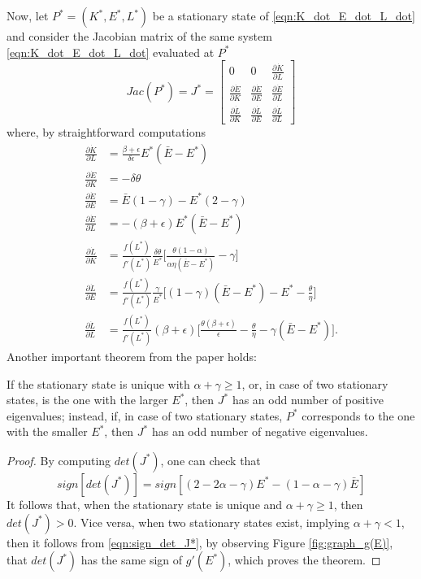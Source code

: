 Now, let $P^*=(K^*,E^*,L^*)$ be a stationary state of \eqref{eqn:K_dot_E_dot_L_dot} and consider the Jacobian matrix of the same system \eqref{eqn:K_dot_E_dot_L_dot} evaluated at $P^*$
$$
Jac(P^*)=J^* =
\begin{bmatrix}
	0 & 
	0 & 
	\frac{\partial\dot{K}}{\partial L} \\[1ex] %
	\frac{\partial\dot{E}}{\partial K} & 
	\frac{\partial\dot{E}}{\partial E} & 
	\frac{\partial\dot{E}}{\partial L} \\[1ex]
	\frac{\partial\dot{L}}{\partial K} & 
	\frac{\partial\dot{L}}{\partial E} & 
	\frac{\partial\dot{L}}{\partial L}
\end{bmatrix}
$$
where, by straightforward computations
\begin{equation} \label{eqn:part_deriv_Kdot_Ldot_Edot}
	\begin{split}
		\frac{\partial\dot{K}}{\partial L} &= \frac{\beta+\epsilon}{\delta\epsilon}E^*(\bar{E}-E^*)\\
		\frac{\partial\dot{E}}{\partial K} &=-\delta\theta \\
		\frac{\partial\dot{E}}{\partial E} &=\bar{E}(1-\gamma)-E^*(2-\gamma)\\
		\frac{\partial\dot{E}}{\partial L} &=-(\beta+\epsilon)E^*(\bar{E}-E^*)\\
		\frac{\partial\dot{L}}{\partial K} &=\frac{f(L^*)}{f'(L^*)}\frac{\delta\theta}{E^*} \Bigg[\frac{\theta(1-\alpha)}{\alpha\eta(\bar{E}-E^*)}-\gamma\Bigg]\\
		\frac{\partial\dot{L}}{\partial E} &=\frac{f(L^*)}{f'(L^*)}\frac{\gamma}{E^*} \Bigg[ (1-\gamma)(\bar{E}-E^*)-E^*-\frac{\theta}{\eta} \Bigg]\\
		\frac{\partial\dot{L}}{\partial L} &=\frac{f(L^*)}{f'(L^*)}(\beta+\epsilon) \Bigg[ \frac{\theta(\beta+\epsilon)}{\epsilon}-\frac{\theta}{\eta}-\gamma(\bar{E}-E^*) \Bigg].
	\end{split}
\end{equation}
Another important theorem from the paper holds: 
\begin{thm} \label{thm:num_eigenval_from_Jac}
	If the stationary state is unique with $\alpha+\gamma\geq1$, or, in case of two stationary states, is the one with the larger $E^*$, then $J^*$ has an odd number of positive eigenvalues; instead, if, in case of two stationary states, $P^*$ corresponds to the one with the smaller $E^*$, then $J^*$ has an odd number of negative eigenvalues.
\end{thm}
\begin{proof}
	By computing $det(J^*)$, one can check that
	\begin{equation} \label{eqn:sign_det_J*}
		sign[det(J^*)] = sign[(2-2\alpha-\gamma)E^*-(1-\alpha-\gamma)\bar{E}]
	\end{equation}
	It follows that, when the stationary state is unique and $\alpha+\gamma\geq1$, then $det(J^*) > 0$. Vice versa, when two stationary states exist, implying $\alpha+\gamma<1$, then it follows from \eqref{eqn:sign_det_J*}, by observing Figure \ref{fig:graph_g(E)}, that $det(J^*)$ has the same sign of $g'(E^*)$, which proves the theorem. 
\end{proof}

